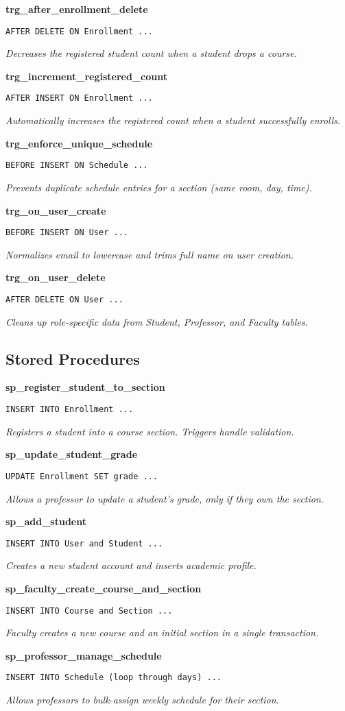 \textbf{trg\_after\_enrollment\_delete}
\begin{verbatim}
AFTER DELETE ON Enrollment ...
\end{verbatim}
\textit{Decreases the registered student count when a student drops a course.}

\textbf{trg\_increment\_registered\_count}
\begin{verbatim}
AFTER INSERT ON Enrollment ...
\end{verbatim}
\textit{Automatically increases the registered count when a student successfully enrolls.}

\textbf{trg\_enforce\_unique\_schedule}
\begin{verbatim}
BEFORE INSERT ON Schedule ...
\end{verbatim}
\textit{Prevents duplicate schedule entries for a section (same room, day, time).}

\textbf{trg\_on\_user\_create}
\begin{verbatim}
BEFORE INSERT ON User ...
\end{verbatim}
\textit{Normalizes email to lowercase and trims full name on user creation.}

\textbf{trg\_on\_user\_delete}
\begin{verbatim}
AFTER DELETE ON User ...
\end{verbatim}
\textit{Cleans up role-specific data from Student, Professor, and Faculty tables.}


\subsection{Stored Procedures}

\textbf{sp\_register\_student\_to\_section}
\begin{verbatim}
INSERT INTO Enrollment ...
\end{verbatim}
\textit{Registers a student into a course section. Triggers handle validation.}

\textbf{sp\_update\_student\_grade}
\begin{verbatim}
UPDATE Enrollment SET grade ...
\end{verbatim}
\textit{Allows a professor to update a student’s grade, only if they own the section.}

\textbf{sp\_add\_student}
\begin{verbatim}
INSERT INTO User and Student ...
\end{verbatim}
\textit{Creates a new student account and inserts academic profile.}

\textbf{sp\_faculty\_create\_course\_and\_section}
\begin{verbatim}
INSERT INTO Course and Section ...
\end{verbatim}
\textit{Faculty creates a new course and an initial section in a single transaction.}

\textbf{sp\_professor\_manage\_schedule}
\begin{verbatim}
INSERT INTO Schedule (loop through days) ...
\end{verbatim}
\textit{Allows professors to bulk-assign weekly schedule for their section.}
